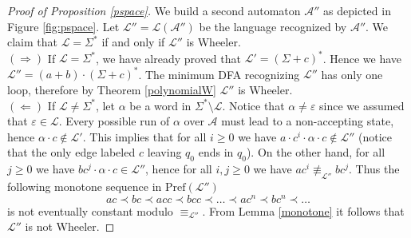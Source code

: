 \documentclass[runningheads]{llncs}
\newcommand{\pf}[1]{\text{Pref}(\mathcal #1)}
\newcommand{\la}[1]{\mathcal L(\mathcal #1)}
\begin{document}
\begin{proof}[\noindent Proof of Proposition \ref{pspace}]
We build a second automaton $\mathcal A''$ as depicted in Figure \ref{fig:pspace}. Let $\mathcal L'' = \la {A''}$ be the language recognized by $\mathcal A''$. We claim that $\mathcal L = \Sigma^*$ if and only if $\mathcal L''$ is Wheeler.
\\$(\Longrightarrow)$ If $\mathcal L = \Sigma^*$, we have already proved that $\mathcal L' = (\Sigma+c)^*$. Hence we have $\mathcal L'' = (a + b) \cdot (\Sigma+c)^*$. The minimum DFA recognizing $\mathcal L''$ has only one loop, therefore by Theorem \ref{polynomialW} $\mathcal L''$ is Wheeler.
\\$(\Longleftarrow)$ If $\mathcal L \ne \Sigma^*$, let $\alpha$ be a word in $\Sigma^* \setminus \mathcal L$. Notice that $\alpha \ne \varepsilon$ since we assumed that $\varepsilon \in \mathcal L$. Every possible run of $\alpha$ over $\mathcal A$ must lead to a non-accepting state, hence $\alpha \cdot c \notin \mathcal L'$. 
This implies that for all $i \ge 0$ we have $a \cdot c^i \cdot \alpha \cdot c \notin \mathcal L''$ (notice that the only edge labeled $c$ leaving $q_0$ ends in $q_0$). On the other hand, for all $j \ge 0$ we have $bc^j \cdot \alpha \cdot c \in \mathcal L''$, hence for all $i, j \ge 0$ we have $ac^i \not\equiv_{\mathcal L''} bc^j$. 
Thus the following monotone sequence in $\pf {L''}$
\[
ac \prec bc \prec acc \prec bcc \prec \dots \prec ac^n \prec bc^n \prec \dots
\]
is not eventually constant modulo $\equiv_\mathcal{L''}$. From Lemma \ref{monotone} it follows that $\mathcal L''$ is not Wheeler.
\end{proof}
\end{document}
